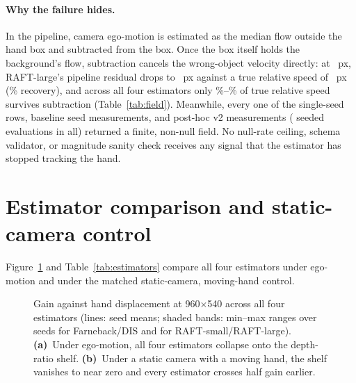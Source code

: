 \documentclass[11pt]{article}
\begin{document}
\begin{table}[t]
\centering\small
\resizebox{\linewidth}{!}{}
\caption{Pixel-level flow-field metrics inside the hand box at 960$\times$540 under ego-motion
(means over \cgNSeeds{} seeds for Farneback/DIS and \cgNSeedsRaft{} seeds for RAFT-small/RAFT-large).
\emph{Closer bg}: share of box pixels closer in $L_2$ distance to true background flow than hand
flow. \emph{Locked bg}: share within 25\% of $\|v_{\mathrm{hand}}-v_{\mathrm{bg}}\|$ of background
flow. \emph{Resid.\ rec.}: pipeline ego-motion-subtracted RMS residual as a share of true residual.}
\label{tab:field}
\end{table}

\paragraph{Why the failure hides.}
In the pipeline, camera ego-motion is estimated as the median flow outside the hand box and
subtracted from the box. Once the box itself holds the background's flow, subtraction cancels the
wrong-object velocity directly: at \cgDispShelfProbe{}~px, RAFT-large's pipeline residual drops to
\cgFieldRaftLResPx{}~px against a true relative speed of \cgFieldTrueResHi{}~px
(\cgFieldRecMinPct{}\% recovery), and across all four estimators only
\cgFieldRecMinPct{}\%--\cgFieldRecMaxPct{}\% of true relative speed survives subtraction
(Table~\ref{tab:field}). Meanwhile, every one of the \cgPublishedRows{} single-seed rows,
\cgSeedMeasurements{} baseline seed measurements, and \cgVTwoMeasurements{} post-hoc v2
measurements (\cgTotalMeasurements{} seeded evaluations in all) returned a finite, non-null field.
No null-rate ceiling, schema validator, or magnitude sanity check receives any signal that the
estimator has stopped tracking the hand.

\section{Estimator comparison and static-camera control}
\label{sec:estimators}

Figure~\ref{fig:gain_v2} and Table~\ref{tab:estimators} compare all four estimators under
ego-motion and under the matched static-camera, moving-hand control.

\begin{figure}[t]
\centering

\caption{Gain against hand displacement at 960$\times$540 across all four estimators (lines: seed
means; shaded bands: min--max ranges over \cgNSeeds{} seeds for Farneback/DIS and \cgNSeedsRaft{}
for RAFT-small/RAFT-large). \textbf{(a)}~Under ego-motion, all four estimators collapse onto the
\cgRatio{} depth-ratio shelf. \textbf{(b)}~Under a static camera with a moving hand, the shelf
vanishes to near zero and every estimator crosses half gain earlier.}
\label{fig:gain_v2}
\end{figure}
\end{document}
